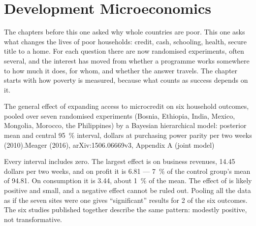 \chapter{Development Microeconomics}\label{ch:b3:development-microeconomics}

The chapters before this one asked why whole countries are poor. This one asks what
changes the lives of poor households: credit, cash, schooling, health, secure title
to a home. For each question there are now randomised experiments, often several,
and the interest has moved from whether a programme works somewhere to how much it
does, for whom, and whether the answer travels. The chapter starts with how poverty
is measured, because what counts as success depends on it.

\begin{openingchart}{The general effect of expanding access to microcredit on six
household outcomes, pooled over seven randomised experiments (Bosnia, Ethiopia, India,
Mexico, Mongolia, Morocco, the Philippines) by a Bayesian hierarchical model: posterior mean and central 95~\%
interval, dollars at purchasing power parity per two weeks (2010).}{Meager (2016),
arXiv:1506.06669v3, Appendix A (joint model)}
\end{openingchart}

Every interval includes zero. The largest effect is on business revenues, 14.45 dollars per two weeks, and on profit it is
6.81 --- 7~\% of the control group's mean of 94.81. On consumption it is 3.44, about 1~\% of the mean. The effect of
 is likely positive and small, and a negative effect cannot be ruled out.
Pooling all the data as if the seven sites were one gives ``significant'' results for 2 of the six
outcomes. The six studies published together describe the same pattern: modestly positive, not
transformative. %

